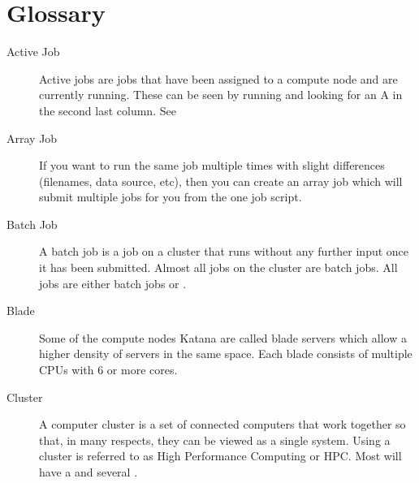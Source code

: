 \documentclass[letterpaper,10pt,english]{sphinxmanual}
\begin{document}
\chapter{Glossary}
\label{\detokenize{glossary:glossary}}\label{\detokenize{glossary::doc}}\begin{description}
\item[{Active Job\label{\detokenize{glossary:term-Active-Job}}}] \leavevmode
Active jobs are jobs that have been assigned to a compute node and are currently running. These can be seen by running  and looking for an A in the second last column. See {\hyperref[\detokenize{using_katana/running_jobs:more-info-from-pbs}]{}}

\item[{Array Job\label{\detokenize{glossary:term-Array-Job}}}] \leavevmode
If you want to run the same job multiple times with slight differences (filenames, data source, etc), then you can create an array job which will submit multiple jobs for you from the one job script.

\item[{Batch Job\label{\detokenize{glossary:term-Batch-Job}}}] \leavevmode
A batch job is a job on a cluster that runs without any further input once it has been submitted. Almost all jobs on the cluster are batch jobs. All jobs are either batch jobs or {\hyperref[\detokenize{glossary:term-Interactive-Job}]{}}.

\item[{Blade\label{\detokenize{glossary:term-Blade}}}] \leavevmode
Some of the compute nodes Katana are called blade servers which allow a higher density of servers in the same space. Each blade consists of multiple CPUs with 6 or more cores.

\item[{Cluster\label{\detokenize{glossary:term-Cluster}}}] \leavevmode
A computer cluster is a set of connected computers that work together so that, in many respects, they can be viewed as a single system. Using a cluster is referred to as High Performance Computing or HPC. Most will have a {\hyperref[\detokenize{glossary:term-Management-Plane}]{}} and several {\hyperref[\detokenize{glossary:term-Compute-Nodes}]{}}.


\end{description}
\end{document}
